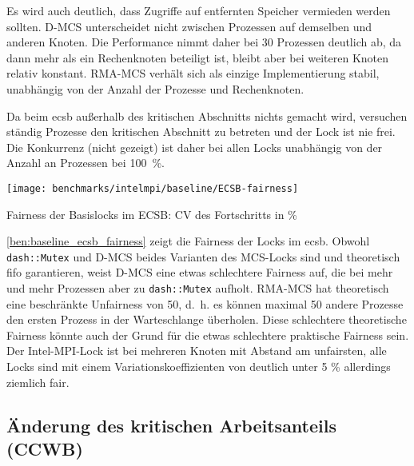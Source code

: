 Es wird auch deutlich,
dass Zugriffe auf entfernten Speicher vermieden werden sollten.
D-MCS unterscheidet nicht zwischen Prozessen auf demselben und anderen Knoten.
Die Performance nimmt daher bei 30 Prozessen deutlich ab,
da dann mehr als ein Rechenknoten beteiligt ist,
bleibt aber bei weiteren Knoten relativ konstant.
RMA-MCS verhält sich als einzige Implementierung stabil,
unabhängig von der Anzahl der Prozesse und Rechenknoten.

Da beim \gls{ecsb} außerhalb des kritischen Abschnitts nichts gemacht wird,
versuchen ständig Prozesse den kritischen Abschnitt zu betreten
und der Lock ist nie frei.
Die \gls{Konkurrenz} (nicht gezeigt) ist daher bei allen Locks unabhängig von der Anzahl an Prozessen bei 100~\%.

\begin{benchmark}[h]
    \centering
    \texttt{[image: benchmarks/intelmpi/baseline/ECSB-fairness]}
    \caption{Fairness der Basislocks im ECSB: CV des Fortschritts in \%}
    \label{ben:baseline_ecsb_fairness}
\end{benchmark}

\autoref{ben:baseline_ecsb_fairness} zeigt die Fairness der Locks im \gls{ecsb}.
Obwohl \texttt{dash::Mutex} und D-MCS beides Varianten des MCS-Locks sind
und theoretisch \gls{fifo} garantieren,
weist D-MCS eine etwas schlechtere Fairness auf,
die bei mehr und mehr Prozessen aber zu \texttt{dash::Mutex} aufholt.
RMA-MCS hat theoretisch eine beschränkte Unfairness von 50,
d.~h. es können maximal 50 andere Prozesse den ersten Prozess in der Warteschlange überholen.
Diese schlechtere theoretische Fairness könnte auch der Grund für die etwas schlechtere praktische Fairness sein.
Der Intel-MPI-Lock ist bei mehreren Knoten mit Abstand am unfairsten,
alle Locks sind mit einem Variationskoeffizienten von deutlich unter 5 \% allerdings ziemlich fair.

\subsection{Änderung des kritischen Arbeitsanteils (CCWB)}
\label{sec:ccwb}

